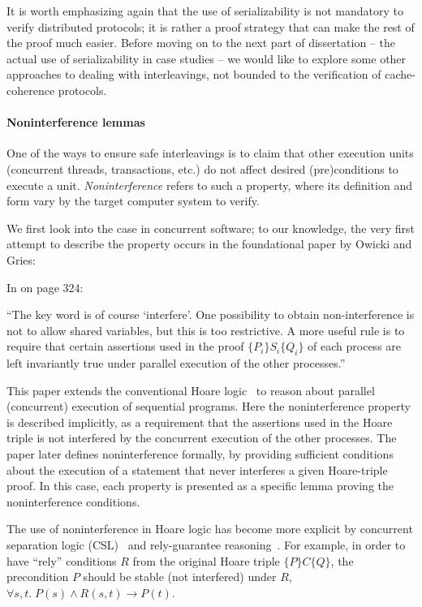 It is worth emphasizing again that the use of serializability is not mandatory to verify distributed protocols; it is rather a proof strategy that can make the rest of the proof much easier.
Before moving on to the next part of dissertation -- the actual use of serializability in case studies -- we would like to explore some other approaches to dealing with interleavings, not bounded to the verification of cache-coherence protocols.

\paragraph{Noninterference lemmas}

One of the ways to ensure safe interleavings is to claim that other execution units (concurrent threads, transactions, etc.) do not affect desired (pre)conditions to execute a unit.
\emph{Noninterference} refers to such a property, where its definition and form vary by the target computer system to verify.

We first look into the case in concurrent software; to our knowledge, the very first attempt to describe the property occurs in the foundational paper by Owicki and Gries:
\begin{displayquote}
  In \cite{Owicki:1976} on page 324:

  ``The key word is of course `interfere'.
  One possibility to obtain non-interference is not to allow shared variables, but this is too restrictive.
  A more useful rule is to require that certain assertions used in the proof $\{P_i\} S_i \{Q_i\}$ of each process are left invariantly true under parallel execution of the other processes.''
\end{displayquote}
This paper extends the conventional Hoare logic~\cite{Hoare} to reason about parallel (concurrent) execution of sequential programs.
Here the noninterference property is described implicitly, as a requirement that the assertions used in the Hoare triple is not interfered by the concurrent execution of the other processes.
The paper later defines noninterference formally, by providing sufficient conditions about the execution of a statement that never interferes a given Hoare-triple proof.
In this case, each property is presented as a specific lemma proving the noninterference conditions.

The use of noninterference in Hoare logic has become more explicit by concurrent separation logic (CSL)~\cite{OHearn:2004} and rely-guarantee reasoning~\cite{Jones:1983}.
For example, in order to have ``rely'' conditions $R$ from the original Hoare triple $\{P\}C\{Q\}$, the precondition $P$ should be stable (not interfered) under $R$, \ie{} $\forall s, t.\; P(s) \wedge R(s, t) \to P(t)$.

